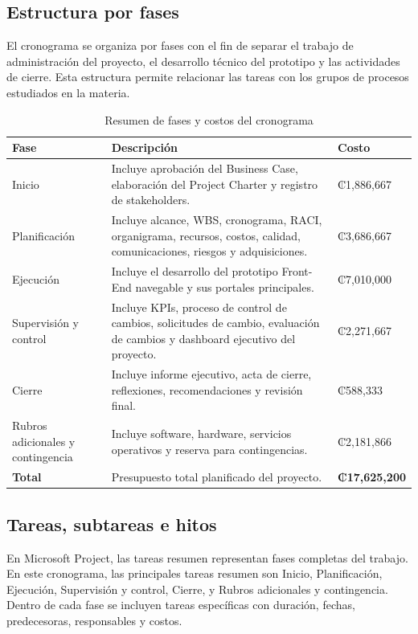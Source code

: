 \documentclass[11pt,spanish]{article}
\begin{document}


\subsection{Estructura por fases}

El cronograma se organiza por fases con el fin de separar el trabajo de administración del proyecto, el desarrollo técnico del prototipo y las actividades de cierre. Esta estructura permite relacionar las tareas con los grupos de procesos estudiados en la materia.

\begin{table}[H]
\centering
\caption{Resumen de fases y costos del cronograma}
\begin{tabularx}{\textwidth}{p{3.8cm} Y p{3cm}}
\toprule
\textbf{Fase} & \textbf{Descripción} & \textbf{Costo} \\
\midrule
Inicio & Incluye aprobación del Business Case, elaboración del Project Charter y registro de stakeholders. & ₡1,886,667 \\
Planificación & Incluye alcance, WBS, cronograma, RACI, organigrama, recursos, costos, calidad, comunicaciones, riesgos y adquisiciones. & ₡3,686,667 \\
Ejecución & Incluye el desarrollo del prototipo Front-End navegable y sus portales principales. & ₡7,010,000 \\
Supervisión y control & Incluye KPIs, proceso de control de cambios, solicitudes de cambio, evaluación de cambios y dashboard ejecutivo del proyecto. & ₡2,271,667 \\
Cierre & Incluye informe ejecutivo, acta de cierre, reflexiones, recomendaciones y revisión final. & ₡588,333 \\
Rubros adicionales y contingencia & Incluye software, hardware, servicios operativos y reserva para contingencias. & ₡2,181,866 \\
\midrule
\textbf{Total} & Presupuesto total planificado del proyecto. & \textbf{₡17,625,200} \\
\bottomrule
\end{tabularx}
\end{table}

\subsection{Tareas, subtareas e hitos}

En Microsoft Project, las tareas resumen representan fases completas del trabajo. En este cronograma, las principales tareas resumen son Inicio, Planificación, Ejecución, Supervisión y control, Cierre, y Rubros adicionales y contingencia. Dentro de cada fase se incluyen tareas específicas con duración, fechas, predecesoras, responsables y costos.
\end{document}
